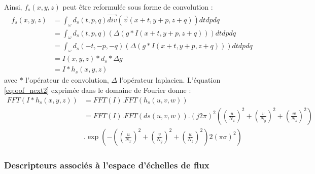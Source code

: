   Ainsi, $f_s(x,y,z)$ peut être reformulée sous forme de convolution :
  \begin{align}
    f_s(x,y,z) & = \int_{\omega} d_s(t,p,q) \vec{div}( \vec{v}(x+t,y+p, z+q) ) dtdpdq \\
              \nonumber
               & = \int_{\omega} d_s(t,p,q) (\Delta(g*I(x+t,y+p, z+q))) dtdpdq \\
               \nonumber
               & = \int_{\omega} d_s(-t,-p,-q) (\Delta(g*I(x+t,y+p, z+q))) dtdpdq \\
               \nonumber
               & = I(x,y,z) * d_s * \Delta g \\
               \nonumber
               & = I * h_s(x,y,z)
    \label{eq:oof_next2}
  \end{align}
  avec $*$ l'opérateur de convolution, $\Delta$ l'opérateur laplacien.
  L'équation \ref{eq:oof_next2} exprimée dans le domaine de Fourier donne :
  \begin{align}
    FFT( I * h_s(x,y,z) ) &= FFT(I) . FFT(h_s(u,v,w)) \\
                          \nonumber
                          &= FFT(I) . FFT(ds(u,v,w)) . (j2 \pi)^2 ( (\frac{u}{N_x})^2 + (\frac{v}{N_y})^2 + (\frac{w}{N_z})^2 )  \\
                          \nonumber
                          & . \exp( -( (\frac{u}{N_x})^2 + (\frac{v}{N_y})^2 + (\frac{w}{N_z})^2 ) 2(\pi\sigma)^2 )
  \end{align}
\subsubsection{Descripteurs associés à l'espace d'échelles de flux}

